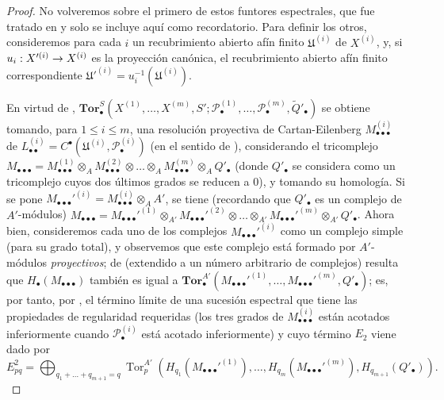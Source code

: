 \documentclass[10pt,oneside,openany]{book}
\theoremstyle{egaenv}\newtheorem*{env}{---}
\theoremstyle{egastatement}
\theoremstyle{egadescription}
\renewcommand{\leq}{\leqslant}
\renewcommand{\to}{\mathchoice{\longrightarrow}{\rightarrow}{\rightarrow}{\rightarrow}}
\begin{document}
\begin{proof}
No volveremos sobre el primero de estos funtores espectrales, que fue tratado
en  y solo se incluye aquí como recordatorio. Para definir
los otros, consideremos para cada $i$ un recubrimiento abierto afín finito
$\mathfrak U^{(i)}$ de $X^{(i)}$, y, si
$u_i:X'^{(i)}\to X^{(i)}$ es la proyección canónica, el recubrimiento abierto
afín finito correspondiente
$\mathfrak U'^{(i)}=u_i^{-1}(\mathfrak U^{(i)})$.

En virtud de ,
$\mathbf{Tor}_\bullet^S(X^{(1)},\ldots,X^{(m)},S';
\mathscr P_\bullet^{(1)},\ldots,\mathscr P_\bullet^{(m)},
\widetilde{Q}'_\bullet)$ se obtiene tomando, para $1\leq i\leq m$, una
resolución proyectiva de Cartan-Eilenberg
$M_{\bullet\bullet\bullet}^{(i)}$ de
$L_{\bullet\bullet}^{(i)}=C^\bullet(\mathfrak U^{(i)},
\mathscr P_\bullet^{(i)})$ (en el sentido de ),
considerando el tricomplejo
$M_{\bullet\bullet\bullet}
=M_{\bullet\bullet\bullet}^{(1)}\otimes_A
M_{\bullet\bullet\bullet}^{(2)}\otimes\ldots\otimes_A
M_{\bullet\bullet\bullet}^{(m)}\otimes_A Q'_\bullet$
(donde $Q'_\bullet$ se considera como un tricomplejo cuyos dos últimos
grados se reducen a $0$), y tomando su homología. Si se pone
$M_{\bullet\bullet\bullet}'^{(i)}=
M_{\bullet\bullet\bullet}^{(i)}\otimes_A A'$, se tiene (recordando que
$Q'_\bullet$ es un complejo de $A'$-módulos)
$M_{\bullet\bullet\bullet}
=M_{\bullet\bullet\bullet}'^{(1)}\otimes_{A'}
M_{\bullet\bullet\bullet}'^{(2)}\otimes\ldots\otimes_{A'}
M_{\bullet\bullet\bullet}'^{(m)}\otimes_{A'} Q'_\bullet$.
Ahora bien, consideremos cada uno de los complejos
$M_{\bullet\bullet\bullet}'^{(i)}$ como un complejo simple (para su grado
total), y observemos que este complejo está formado por $A'$-módulos
\emph{proyectivos}; de  (extendido a un número arbitrario de
complejos) resulta que $H_\bullet(M_{\bullet\bullet\bullet})$ también es
igual a
$\mathbf{Tor}_\bullet^{A'}
(M_{\bullet\bullet\bullet}'^{(1)},\ldots,
M_{\bullet\bullet\bullet}'^{(m)},Q'_\bullet)$;
es, por tanto, por , el término límite de una sucesión
espectral que tiene las propiedades de regularidad requeridas (los tres
grados de $M_{\bullet\bullet\bullet}^{(i)}$ están acotados inferiormente
cuando $\mathscr P_\bullet^{(i)}$ está acotado inferiormente) y cuyo término
$E_2$ viene dado por
\[
  E_{pq}^2
  =\bigoplus_{q_1+\ldots+q_{m+1}=q}
  \operatorname{Tor}_p^{A'}
  (H_{q_1}(M_{\bullet\bullet\bullet}'^{(1)}),\ldots,
   H_{q_m}(M_{\bullet\bullet\bullet}'^{(m)}),H_{q_{m+1}}(Q'_\bullet)).
\]


\end{proof}
\end{document}

